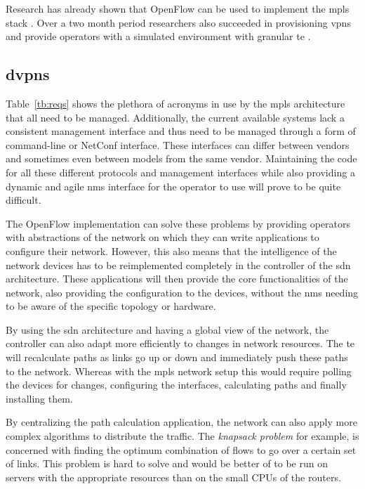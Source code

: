 Research has already shown that OpenFlow can be used to implement the \ac{mpls} stack \cite{mpls-open}. Over a two month period researchers also succeeded in provisioning \acp{vpn} and provide operators with a simulated environment with granular \ac{te} \cite{mpls-vpn-openflow}.


\subsection{\acp{dvpn}} %
\label{sub:dvpn}

Table~\ref{tb:reqs} shows the plethora of acronyms in use by the \ac{mpls} architecture that all need to be managed. Additionally, the current available systems lack a consistent management interface and thus need to be managed through a form of command-line or NetConf interface. These interfaces can differ between vendors and sometimes even between models from the same vendor. Maintaining the code for all these different protocols and management interfaces while also providing a dynamic and agile \ac{nms} interface for the operator to use will prove to be quite difficult.

The OpenFlow implementation can solve these problems by providing operators with abstractions of the network on which they can write applications to configure their network. However, this also means that the intelligence of the network devices has to be reimplemented completely in the controller of the \ac{sdn} architecture. These applications will then provide the core functionalities of the network, also providing the configuration to the devices, without the \ac{nms} needing to be aware of the specific topology or hardware. 

By using the \ac{sdn} architecture and having a global view of the network, the controller can also adapt more efficiently to changes in network resources. The \ac{te} will recalculate paths as links go up or down and immediately push these paths to the network. Whereas with the \ac{mpls} network setup this would require polling the devices for changes, configuring the interfaces, calculating paths and finally installing them. 

By centralizing the path calculation application, the network can also apply more complex algorithms to distribute the traffic. The \textsl{knapsack problem} for example, is concerned with finding the optimum combination of flows to go over a certain set of links. This problem is hard to solve and would be better of to be run on servers with the appropriate resources than on the small CPUs of the routers. 

